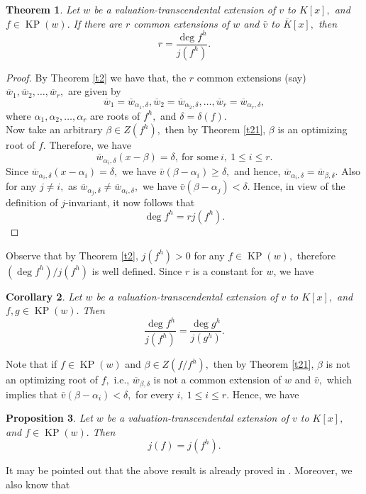 \documentclass[11pt]{amsart}
\newtheorem{theorem}{Theorem}[section]
\newtheorem{proposition}[theorem]{Proposition}
\newtheorem{corollary}[theorem]{Corollary}
\theoremstyle{definition}
\theoremstyle{remark}
\numberwithin{equation}{section}
\begin{document}
\begin{theorem}\label{p23}
	Let $w$ be a valuation-transcendental extension of $v$ to $K[x],$ and $f\in \operatorname{KP}(w).$ If there are $r$ common extensions of $w$ and $\bar{v}$ to $\overline{K}[x],$ then \[r=\frac{\deg f^h}{j(f^h)}.\]
\end{theorem}
\begin{proof}
 By Theorem \ref{t2} we have that, the $r$ common extensions (say)  $\overline{w}_1, \overline{w}_2, \ldots ,\overline{w}_r ,$ are given by\[\overline{w}_1=\overline{w}_{\alpha_1,\delta}, \overline{w}_2=\overline{w}_{\alpha_2,\delta}, \ldots ,\overline{w}_r=\overline{w}_{\alpha_r,\delta},\] where $\alpha_1, \alpha_2, \ldots ,\alpha_r$ are roots of $f^h,$ and $\delta=\delta(f).$\\
Now take an arbitrary $\beta\in Z(f^h),$ then by Theorem \ref{t21}, $\beta$ is an optimizing root of $f.$ Therefore, we have \[\overline{w}_{\alpha_i,\delta}(x-\beta)=\delta,\  \text{for some} \ i,\ 1\leq i\leq r.\]
Since $\overline{w}_{\alpha_i,\delta}(x-\alpha_i)=\delta,$ we have $\bar{v}(\beta-\alpha_i)\geq \delta,$ and hence, $\overline{w}_{\alpha_i,\delta}=\overline{w}_{\beta,\delta}.$ Also for any $j\neq i,$ as $\overline{w}_{\alpha_j,\delta}\neq \overline{w}_{\alpha_i,\delta},$  we have $\bar{v}(\beta-\alpha_j)<\delta.$ Hence, in view of the definition of $j$-invariant, it now follows that \[\deg f^h=r j(f^h).\] 	
\end{proof}
 Observe that by Theorem \ref{t2}, $j(f^h)>0$ for any $f\in\operatorname{KP}(w),$ therefore $(\deg f^h)/j(f^h)$ is well defined. Since $r$ is a constant for $w$, we have 
\begin{corollary}
	Let $w$ be a valuation-transcendental extension of $v$ to $K[x],$ and $f, g\in \operatorname{KP}(w).$ Then \[\frac{\deg f^h}{j(f^h)}=\frac{\deg g^h}{j(g^h)} .\]
\end{corollary}
Note that if $f\in\operatorname{KP}(w)$ and $\beta\in Z(f/f^h),$ then by Theorem \ref{t21}, $\beta$ is not an optimizing root of $f,$ i.e., $\overline{w}_{\beta,\delta}$ is not a common extension of $w$ and $\bar{v},$ which implies that $\bar{v}(\beta-\alpha_i)<\delta,$ for every $i, \ 1\leq i \leq r.$ Hence, we have 
\begin{proposition}\label{dt2}
	Let $w$ be a valuation-transcendental extension of $v$ to $K[x],$ and $f\in \operatorname{KP}(w).$ Then 
	\[j(f)=j(f^h).\]
\end{proposition}
It may be pointed out that the above result is already proved in \cite[Proposition 2.7]{AR}. Moreover, we also know that
\end{document}
